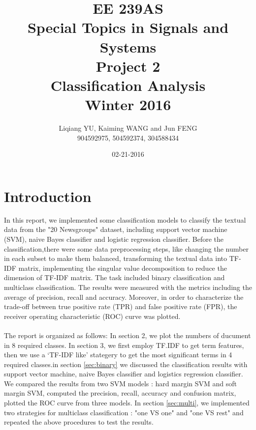 \documentclass{article}
\begin{document}
\begin{titlepage}
\title{EE 239AS \\Special Topics in Signals and Systems\\Project 2\\Classification Analysis\\Winter 2016} 
\author{Liqiang YU, Kaiming WANG and Jun FENG\\
904592975, 504592374, 304588434} 
\date{02-21-2016}
\end{titlepage}

\maketitle
\newpage
\tableofcontents
\newpage
\section{Introduction}
In this report, we implemented some classification models to classify the textual data from the "20 Newsgroups" dataset, including support vector machine (SVM), naive Bayes classifier and logistic regression classifier. Before the classification,there were some data preprocessing steps, like changing the number in each subset to make them balanced, transforming the textual data into TF-IDF matrix, implementing the singular value decomposition to reduce the dimension of TF-IDF matrix. The task included binary classification and multiclass classification. The results were measured with the metrics including the average of precision, recall and accuracy. Moreover, in order to characterize the trade-off between true positive rate (TPR) and false positive rate (FPR), the receiver operating characteristic (ROC) curve was plotted.\\
\\
The report is organized as follows: In section 2, we plot the numbers of ducument in 8 required classes. In section 3, we first employ TF.IDF to get term features, then we use a `TF-IDF like' stategery to get the most significant terms in 4 required classes.in section \ref{sec:binary} we discussed the classification results with support vector machine, naive Bayes classifier and logistics regression classifier. We compared the results from two SVM models : hard margin SVM and soft margin SVM, computed the precision, recall, accuracy and confusion matrix, plotted the ROC curve from three models. In section \ref{sec:multi}, we implemented two strategies for multiclass classification : "one VS one" and "one VS rest" and repeated the above procedures to test the results.
\end{document}
